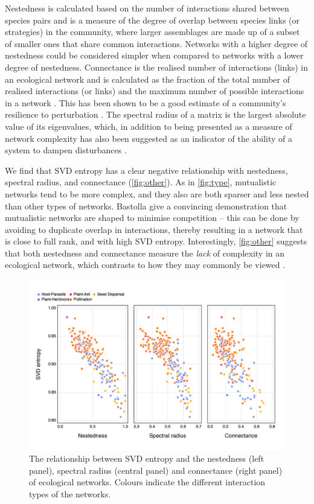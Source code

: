 Nestedness is calculated based on the number of interactions shared between
species pairs and is a measure of the degree of overlap between species links
(or strategies) in the community, where larger assemblages are made up of a
subset of smaller ones that share common interactions. Networks with a higher
degree of nestedness could be considered simpler when compared to networks with
a lower degree of nestedness. Connectance is the realised number of interactions
(links) in an ecological network and is calculated as the fraction of the total
number of realised interactions (or links) and the maximum number of possible
interactions in a network \cite{Martinez1992ConCon}. This has been shown to be a
good estimate of a community's resilience to perturbation
\cite{Dunne2002NetStr}. The spectral radius of a matrix is the largest absolute
value of its eigenvalues, which, in addition to being presented as a measure of
network complexity has also been suggested as an indicator of the ability of a
system to dampen disturbances \cite{Phillips2011StrEco}.

We find that SVD entropy has a clear negative relationship with nestedness,
spectral radius, and connectance (\autoref{fig:other}). As in
\autoref{fig:type}, mutualistic networks tend to be more complex, and they also
are both sparser and less nested than other types of networks.
Bastolla \cite{Bastolla2009ArcMut} give a convincing demonstration that
mutualistic networks are shaped to minimise competition -- this can be done by
avoiding to duplicate overlap in interactions, thereby resulting in a network
that is close to full rank, and with high SVD entropy. Interestingly, \autoref{fig:other}
suggests that both nestedness and connectance measure the \emph{lack} of
complexity in an ecological network, which contrasts to how they may commonly be
viewed \cite{Landi2018ComSta}.

\begin{figure}[h]
    \centering
    \includegraphics[width=\textwidth]{figures/others_v_entropy.png}
    \caption{The relationship between SVD entropy and the nestedness (left
panel), spectral radius (central panel) and connectance (right panel) of
ecological networks. Colours indicate the different interaction types of the
networks.}
    \label{fig:other}
\end{figure}

